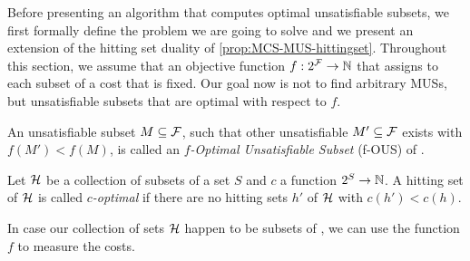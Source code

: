 
Before presenting an algorithm that computes optimal unsatisfiable subsets, we first formally define the problem we are going to solve and we present an extension of the hitting set duality of \cref{prop:MCS-MUS-hittingset}. 
Throughout this section, we assume that an objective function $f: 2^{\mathcal{F}}  \to \mathbb{N}$ that assigns to each subset of \formula a cost that is fixed. Our goal now is not to find arbitrary MUSs, but unsatisfiable subsets that are optimal with respect to $f$. 



\begin{definition}
  An unsatisfiable subset $M\subseteq \mathcal{F} $, such that other unsatisfiable $M'\subseteq \mathcal{F} $ exists with $f(M')<f(M)$, is called an \emph{$f$-Optimal Unsatisfiable Subset} (f-OUS) of \formula.
\end{definition}

\begin{definition}
  Let $\mathcal{H}$ be a collection of subsets of a set $S$ and $c$ a function $2^S\to\mathbb{N}$. 
  A hitting set of $\mathcal{H}$ is called \emph{$c$-optimal} if there are no hitting sets $h'$ of $\mathcal{H}$ with $c(h')<c(h)$. 
\end{definition}
In case our collection of sets $\mathcal{H}$ happen to be subsets of \formula, we can use the function $f$ to measure the costs. 
% 


